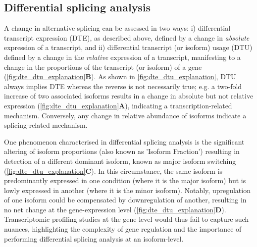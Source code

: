 \subsection{Differential splicing analysis}\label{intro:dtu}
A change in alternative splicing can be assessed in two ways: i) differential transcript expression (DTE), as described above, defined by a change in \textit{absolute} expression of a transcript, and ii) differential transcript (or isoform) usage (DTU) defined by a change in the \textit{relative} expression of a transcript, manifesting to a change in the proportions of the transcript (or isoform) of a gene (\cref{fig:dte_dtu_explanation}\textbf{B}). As shown in \cref{fig:dte_dtu_explanation}, DTU always implies DTE whereas the reverse is not necessarily true; e.g. a two-fold increase of two associated isoforms results in a change in absolute but not relative expression (\cref{fig:dte_dtu_explanation}\textbf{A}), indicating a transcription-related mechanism. Conversely, any change in relative abundance of isoforms indicate a splicing-related mechanism. 

One phenomenon characterised in differential splicing analysis is the significant altering of isoform proportions (also known as 'Isoform Fraction') resulting in detection of a different dominant isoform, known as major isoform switching (\cref{fig:dte_dtu_explanation}\textbf{C}). In this circumstance, the same isoform is predominantly expressed in one condition (where it is the major isoform) but is lowly expressed in another (where it is the minor isoform). Notably, upregulation of one isoform could be compensated by downregulation of another, resulting in no net change at the gene-expression level (\cref{fig:dte_dtu_explanation}\textbf{D}). Transcriptomic profiling studies at the gene level would thus fail to capture such nuances, highlighting the complexity of gene regulation and the importance of performing differential splicing analysis at an isoform-level. 


